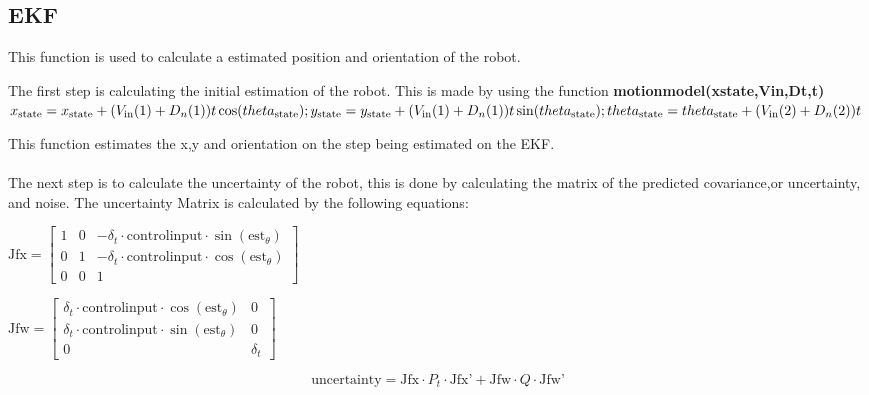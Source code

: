 \documentclass[runningheads]{llncs}
\begin{document}
\break


\subsection*{EKF}
This function is used to calculate a estimated position and orientation of the robot. 


The first step is calculating the  initial estimation of the robot. 
This is made by using the function \textbf{motionmodel(xstate,Vin,Dt,t)}\\
\begin{math}
    x_{\text{state}} = x_{\text{state}} + (V_{\text{in}}(1) + D_n(1))t\cos(theta_{\text{state}}); \\
    y_{\text{state}} = y_{\text{state}} + (V_{\text{in}}(1) + D_n(1))t\sin(theta_{\text{state}}); \\
    theta_{\text{state}} = theta_{\text{state}} + (V_{\text{in}}(2) + D_n(2))t
\end{math}

This function estimates the x,y and orientation on the step being estimated on the EKF. 
\\ \\
The next step is to calculate the uncertainty of the robot, this is done by calculating the matrix of the predicted covariance,or uncertainty, and noise.
The uncertainty Matrix is calculated by the following equations: 
\begin{center}

\begin{math}
    \text{Jfx}=
    \begin{bmatrix} 
        1 & 0 & -\delta_t\cdot\text{controlinput}\cdot\sin(\text{est}_\theta) \\
        0 & 1 & -\delta_t\cdot\text{controlinput}\cdot\cos(\text{est}_\theta) \\
        0 & 0 & 1
    \end{bmatrix}
\end{math}

\begin{math}
    \text{Jfw}=
    \begin{bmatrix}
        \delta_t\cdot\text{controlinput}\cdot\cos(\text{est}_\theta) &0 \\
        \delta_t\cdot\text{controlinput}\cdot\sin(\text{est}_\theta) &0 \\
        0 & \delta_t
    \end{bmatrix}
\end{math}

\begin{equation}
    \text{uncertainty} =\text{Jfx}\cdot P_t \cdot \text{Jfx'}+\text{Jfw}\cdot Q \cdot \text{Jfw'}  
\end{equation}

\end{center}
\end{document}
